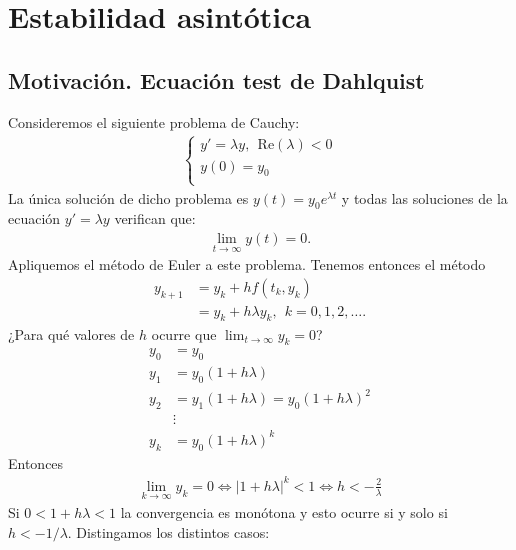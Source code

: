 \chapter{Estabilidad asintótica}

\section{Motivación. Ecuación test de Dahlquist}

Consideremos el siguiente problema de Cauchy:
\begin{align*}
    \left\{ \begin{array}{lcc}
                y' = \lambda y, \ \ \text{Re}(\lambda) < 0 \\
                y(0) = y_0                                 \\
            \end{array}
    \right.
\end{align*}
La única solución de dicho problema es $y(t) = y_0e^{\lambda t}$ y todas las soluciones de la ecuación $y' = \lambda y$ verifican que:
\begin{align*}
    \lim_{t \to \infty} y(t) = 0.
\end{align*}
Apliquemos el método de Euler a este problema. Tenemos entonces el método
\begin{align*}
    y_{k+1} & = y_k + hf(t_k,y_k)                         \\
            & = y_k + h\lambda y_k, \ \ k = 0,1,2,\ldots.
\end{align*}
¿Para qué valores de $h$ ocurre que $\lim_{t \to \infty} y_k = 0$?
\begin{align*}
    y_0 & = y_0                                   \\
    y_1 & = y_0(1+ h\lambda)                      \\
    y_2 & = y_1(1+ h\lambda) = y_0(1+ h\lambda)^2 \\
        & \vdots                                  \\
    y_k & = y_0(1+h\lambda)^k
\end{align*}
Entonces
\begin{align*}
    \lim_{k \to \infty} y_k = 0 \Longleftrightarrow |1+ h\lambda|^k < 1 \Longleftrightarrow h < -\frac{2}{\lambda}
\end{align*}
Si $0 < 1 +h\lambda < 1$ la convergencia es monótona y esto ocurre si y solo si $h < -1/\lambda$. Distingamos los distintos casos:
